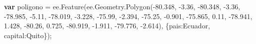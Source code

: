 \documentclass[
  12pt,
  letterpaper,
  twoside]{book}
\newenvironment{Shaded}{\begin{snugshade}}{\end{snugshade}}
\newcommand{\AttributeTok}[1]{\textcolor[rgb]{0.48,0.12,0.64}{#1}}
\newcommand{\ControlFlowTok}[1]{\textcolor[rgb]{0.00,0.00,0.00}{\textbf{#1}}}
\newcommand{\DataTypeTok}[1]{\textcolor[rgb]{0.00,0.00,0.00}{#1}}
\newcommand{\FloatTok}[1]{\textcolor[rgb]{0.28,0.53,0.93}{#1}}
\newcommand{\FunctionTok}[1]{\textcolor[rgb]{0.48,0.12,0.64}{#1}}
\newcommand{\KeywordTok}[1]{\textcolor[rgb]{0.48,0.12,0.64}{#1}}
\newcommand{\NormalTok}[1]{#1}
\newcommand{\OperatorTok}[1]{\textcolor[rgb]{0.00,0.00,0.00}{#1}}
\newcommand{\StringTok}[1]{\textcolor[rgb]{0.87,0.29,0.22}{#1}}
\begin{document}
\begin{Shaded}
\begin{Highlighting}[]
\ControlFlowTok{var}\NormalTok{ poligono }\OperatorTok{=} \KeywordTok{ee}\OperatorTok{.}\FunctionTok{Feature}\NormalTok{(}\KeywordTok{ee}\OperatorTok{.}\AttributeTok{Geometry}\OperatorTok{.}\FunctionTok{Polygon}\NormalTok{(}\OperatorTok{{-}}\FloatTok{80.348}\OperatorTok{,} \OperatorTok{{-}}\FloatTok{3.36}\OperatorTok{,} 
                  \OperatorTok{{-}}\FloatTok{80.348}\OperatorTok{,} \OperatorTok{{-}}\FloatTok{3.36}\OperatorTok{,} \OperatorTok{{-}}\FloatTok{78.985}\OperatorTok{,} \OperatorTok{{-}}\FloatTok{5.11}\OperatorTok{,} 
                  \OperatorTok{{-}}\FloatTok{78.019}\OperatorTok{,} \OperatorTok{{-}}\FloatTok{3.228}\OperatorTok{,} \OperatorTok{{-}}\FloatTok{75.99}\OperatorTok{,} \OperatorTok{{-}}\FloatTok{2.394}\OperatorTok{,} 
                  \OperatorTok{{-}}\FloatTok{75.25}\OperatorTok{,} \OperatorTok{{-}}\FloatTok{0.901}\OperatorTok{,} \OperatorTok{{-}}\FloatTok{75.865}\OperatorTok{,} \FloatTok{0.11}\OperatorTok{,} 
                  \OperatorTok{{-}}\FloatTok{78.941}\OperatorTok{,} \FloatTok{1.428}\OperatorTok{,} \OperatorTok{{-}}\FloatTok{80.26}\OperatorTok{,} \FloatTok{0.725}\OperatorTok{,} 
                  \OperatorTok{{-}}\FloatTok{80.919}\OperatorTok{,} \OperatorTok{{-}}\FloatTok{1.911}\OperatorTok{,} \OperatorTok{{-}}\FloatTok{79.776}\OperatorTok{,} \OperatorTok{{-}}\FloatTok{2.614}\NormalTok{)}\OperatorTok{,}
\NormalTok{              \{}\DataTypeTok{pais}\OperatorTok{:}\StringTok{\textquotesingle{}Ecuador\textquotesingle{}}\OperatorTok{,} 
              \DataTypeTok{capital}\OperatorTok{:}\StringTok{\textquotesingle{}Quito\textquotesingle{}}\NormalTok{\})}\OperatorTok{;}


\end{Highlighting}
\end{Shaded}
\end{document}
